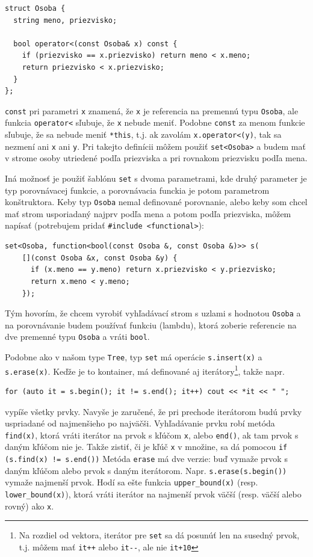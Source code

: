 \documentclass[10pt]{article}
\def\prg{\lstinline}
\def\ods{\vspace*{10pt}}
\begin{document}
{\begin{lstlisting}
struct Osoba {
  string meno, priezvisko;

  bool operator<(const Osoba& x) const {
    if (priezvisko == x.priezvisko) return meno < x.meno;
    return priezvisko < x.priezvisko;
  }
};
\end{lstlisting}

\prg!const! pri parametri {\tt x} 
znamená, že {\tt x} je referencia na premennú typu {\tt Osoba},
ale funkcia \prg!operator<! sľubuje, že {\tt x} nebude meniť. Podobne \prg!const! za menom
funkcie sľubuje, že sa nebude meniť \prg!*this!, t.j. ak zavolám \prg!x.operator<(y)!,
tak sa nezmení ani {\tt x} ani {\tt y}. 
Pri takejto definícii môžem použiť \prg!set<Osoba>! a budem mať v strome osoby utriedené podľa
priezviska a pri rovnakom priezvisku podľa mena.

\ods
Iná možnosť je použiť šablónu {\tt set}
s dvoma parametrami, kde druhý parameter je typ porovnávacej
funkcie, a porovnávacia funckia je potom parametrom konštruktora. 
Keby typ {\tt Osoba} nemal definované porovnanie, alebo keby som chcel
mať strom usporiadaný najprv podľa mena a potom podľa priezviska, môžem napísať
(potrebujem pridať \prg!#include <functional>!):

\begin{lstlisting}
set<Osoba, function<bool(const Osoba &, const Osoba &)>> s(
    [](const Osoba &x, const Osoba &y) {
      if (x.meno == y.meno) return x.priezvisko < y.priezvisko;
      return x.meno < y.meno;
    });
\end{lstlisting}

Tým hovorím, že chcem vyrobiť vyhľadávací strom s uzlami s hodnotou {\tt Osoba} a na 
porovnávanie budem používať funkciu (lambdu), ktorá zoberie referencie na dve premenné
typu {\tt Osoba} a vráti \prg!bool!.

\ods
Podobne ako v našom type {\tt Tree}, typ \prg!set! má
operácie \prg!s.insert(x)! a \prg!s.erase(x)!. Keďže je to kontainer, má 
definované aj iterátory\footnote{Na rozdiel od vektora, iterátor pre \prg!set! sa
dá posunúť len na susedný prvok, t.j. môžem mať \prg!it++! alebo \prg!it--!, ale 
nie \prg!it+10!}, takže napr.

\begin{lstlisting}
for (auto it = s.begin(); it != s.end(); it++) cout << *it << " ";
\end{lstlisting}

vypíše všetky prvky. Navyše je zaručené, že pri prechode iterátorom
budú prvky uspriadané od najmenšieho po najväčši. Vyhľadávanie prvku robí
metóda {\tt find(x)}, ktorá vráti iterátor na prvok s kľúčom {\tt x}, 
alebo {\tt end()}, ak tam 
prvok s daným kľúčom nie je.
Takže zistiť, či je kľúč {\tt x} v množine, sa dá pomocou \prg~if (s.find(x) != s.end())~
Metóda {\tt erase} má dve verzie: buď vymaže prvok s daným kľúčom alebo prvok s
daným iterátorom. Napr. \prg!s.erase(s.begin())! vymaže najmenší prvok.
Hodí sa ešte funkcia \prg!upper_bound(x)! (resp. \prg!lower_bound(x)!), ktorá vráti
iterátor na najmenší prvok väčší (resp. väčší alebo rovný) ako \prg|x|.

}
\end{document}

